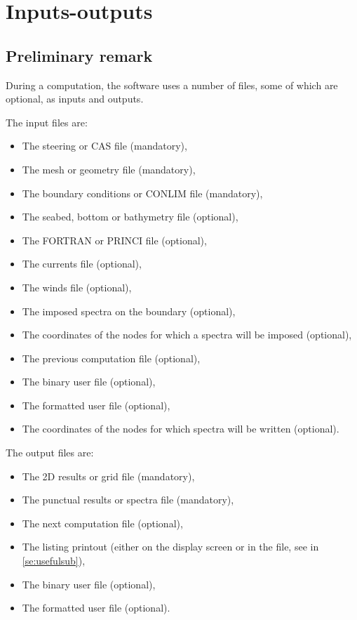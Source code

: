 \chapter{ Inputs-outputs}

\section{ Preliminary remark}

 During a computation, the \tomawac software uses a number of files, some of which are optional, as inputs and outputs.

 The input files are:

\begin{itemize}
\item  The steering or CAS file (mandatory),

\item  The mesh or geometry file (mandatory),

\item  The boundary conditions or CONLIM file (mandatory),

\item  The seabed, bottom or bathymetry file (optional),

\item  The FORTRAN or PRINCI file (optional),

\item  The currents file (optional),

\item  The winds file (optional),

\item The imposed spectra on the boundary (optional),

\item The coordinates of the nodes for which a spectra will be imposed (optional),

\item  The previous computation file (optional),

\item  The binary user file (optional),

\item  The formatted user file (optional),

\item The coordinates of the nodes for which spectra will be written (optional).
\end{itemize}

The output files are:

\begin{itemize}
\item  The 2D results or grid file (mandatory),
\item  The punctual results or spectra file (mandatory),
\item  The next computation file (optional),
\item  The listing printout (either on the display screen or in the file, see in \ref{se:usefulsub}),
\item  The binary user file (optional),
\item  The formatted user file (optional).
\end{itemize}

